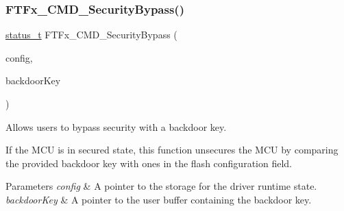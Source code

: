 \subsubsection{\texorpdfstring{FTFx\_CMD\_SecurityBypass()}{FTFx\_CMD\_SecurityBypass()}}
{\footnotesize\ttfamily \mbox{\hyperlink{group__ksdk__common_gaaabdaf7ee58ca7269bd4bf24efcde092}{status\+\_\+t}} F\+T\+Fx\+\_\+\+C\+M\+D\+\_\+\+Security\+Bypass (\begin{DoxyParamCaption}\item[{\mbox{\hyperlink{group__ftfx__controller_gab0196063c05bffb4cd2f249699a3378c}{ftfx\+\_\+config\+\_\+t}} $\ast$}]{config,  }\item[{const uint8\+\_\+t $\ast$}]{backdoor\+Key }\end{DoxyParamCaption})}



Allows users to bypass security with a backdoor key. 

If the M\+CU is in secured state, this function unsecures the M\+CU by comparing the provided backdoor key with ones in the flash configuration field.


\begin{DoxyParams}{Parameters}
{\em config} & A pointer to the storage for the driver runtime state. \\
\hline
{\em backdoor\+Key} & A pointer to the user buffer containing the backdoor key.\\
\hline
\end{DoxyParams}

